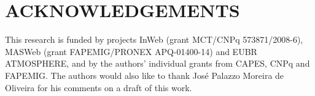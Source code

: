 \documentclass{sig-alternate-10pt}
\begin{document}

\vspace{2mm}
\section{ACKNOWLEDGEMENTS}
This research is funded by projects InWeb (grant MCT/CNPq 573871/2008-6), MASWeb (grant FA\-PE\-MIG/PRONEX APQ-01400-14) and EUBR AT\-MOS\-PHERE, and by the authors' individual grants from CAPES, CNPq and FAPEMIG. The authors would also like to thank Jos\'e Palazzo Moreira de Oliveira for his comments on a draft of this work. 
\vspace{2mm}


 
	
\end{document}
